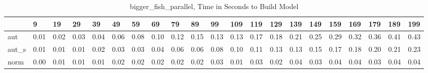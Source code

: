 \begin{table}
\caption{bigger_fish_parallel, Time in Seconds to Build Model}
\label{bigger_fish_parallel_model_time}
\begin{tabular}{lllllllllllllllllllll}
\toprule
 & 9 & 19 & 29 & 39 & 49 & 59 & 69 & 79 & 89 & 99 & 109 & 119 & 129 & 139 & 149 & 159 & 169 & 179 & 189 & 199 \\
\midrule
aut & 0.01 & 0.02 & 0.03 & 0.04 & 0.06 & 0.08 & 0.10 & 0.12 & 0.15 & 0.13 & 0.13 & 0.17 & 0.18 & 0.21 & 0.25 & 0.29 & 0.32 & 0.36 & 0.41 & 0.43 \\
aut_s & 0.01 & 0.01 & 0.01 & 0.02 & 0.03 & 0.03 & 0.04 & 0.06 & 0.06 & 0.08 & 0.10 & 0.11 & 0.13 & 0.13 & 0.15 & 0.17 & 0.18 & 0.20 & 0.21 & 0.23 \\
norm & 0.00 & 0.01 & 0.01 & 0.01 & 0.02 & 0.02 & 0.02 & 0.02 & 0.02 & 0.03 & 0.01 & 0.03 & 0.02 & 0.04 & 0.03 & 0.04 & 0.04 & 0.03 & 0.04 & 0.04 \\
\bottomrule
\end{tabular}
\end{table}
